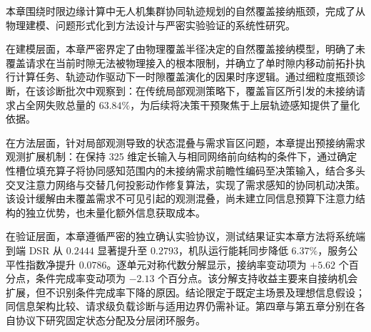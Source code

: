 本章围绕时限边缘计算中无人机集群协同轨迹规划的自然覆盖接纳瓶颈，完成了从物理建模、问题形式化到方法设计与严密实验验证的系统性研究。

在建模层面，本章严密界定了由物理覆盖半径决定的自然覆盖接纳模型，明确了未覆盖请求在当前时隙无法被物理接入的根本限制，并确立了单时隙内移动前拓扑执行计算任务、轨迹动作驱动下一时隙覆盖演化的因果时序逻辑。通过细粒度瓶颈诊断，在该诊断批次中观察到：在传统局部观测策略下，覆盖盲区所引发的未接纳请求占全网失败总量的 $63.84\%$，为后续将决策干预聚焦于上层轨迹感知提供了量化依据。

在方法层面，针对局部观测导致的状态混叠与需求盲区问题，本章提出预接纳需求观测扩展机制：在保持 325 维定长输入与相同网络前向结构的条件下，通过确定性槽位填充算子将协同感知范围内的未接纳需求前瞻性编码至决策输入，结合多头交叉注意力网络与交替几何投影动作修复算法，实现了需求感知的协同机动决策。该设计缓解由未覆盖需求不可见引起的观测混叠，尚未建立同信息预算下注意力结构的独立优势，也未量化额外信息获取成本。

在验证层面，本章遵循严密的独立确认实验协议，测试结果证实本章方法将系统端到端 DSR 从 $0.2444$ 显著提升至 $0.2793$，机队运行能耗同步降低 $6.37\%$，服务公平性指数净提升 $0.0786$。逐单元对称代数分解显示，接纳率变动项为 $+5.62$ 个百分点，条件完成率变动项为 $-2.13$ 个百分点。该分解支持收益主要来自接纳机会扩展，但不识别条件完成率下降的原因。结论限定于既定主场景及理想信息假设；同信息架构比较、请求级负载诊断与适用边界仍需补证。第四章与第五章分别在各自协议下研究固定状态分配及分层闭环服务。


